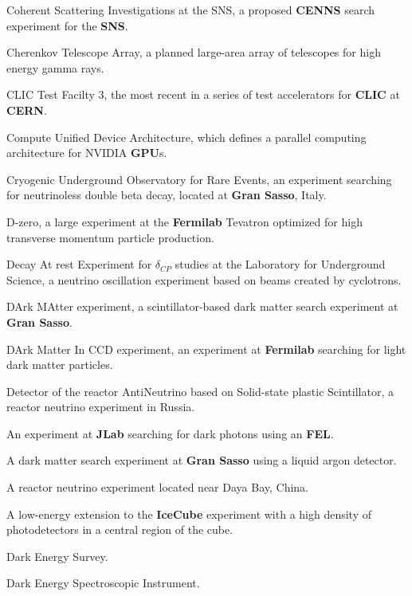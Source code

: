  Coherent Scattering Investigations at the SNS, a
 proposed {\bf CENNS} search experiment for the {\bf SNS}.


 Cherenkov Telescope Array, a planned large-area array of 
telescopes for high energy gamma rays.

  CLIC Test Facilty 3, the most recent in a series of 
      test accelerators for {\bf CLIC} at {\bf CERN}. 

  Compute Unified Device Architecture, which  defines a parallel computing 
  architecture for NVIDIA {\bf GPU}s.


 Cryogenic Underground Observatory for Rare Events, an
experiment searching for neutrinoless double  beta decay, located at
{\bf Gran Sasso}, Italy.

 D-zero, a large experiment at the {\bf Fermilab} Tevatron
optimized for high transverse momentum particle production.  

 Decay At rest Experiment for $\delta_{CP}$ 
studies at the Laboratory for Underground Science, a neutrino oscillation
experiment based on beams created by cyclotrons.

    DArk MAtter experiment, a scintillator-based dark 
 matter search experiment at {\bf Gran Sasso}.


  DArk Matter In CCD experiment, an experiment at 
      {\bf Fermilab} searching for light dark matter  particles.

 Detector of the reactor AntiNeutrino based on
Solid-state plastic Scintillator, a reactor neutrino experiment in
Russia.

  An experiment at {\bf JLab} searching for 
  dark photons using an {\bf FEL}.

  A dark matter search experiment at {\bf Gran
  Sasso}
       using a  liquid argon detector.

 A reactor neutrino experiment located near Daya Bay, China.

 A low-energy extension to the {\bf IceCube} experiment
with a high density of photodetectors in a central region of the cube.


  Dark Energy Survey.

  Dark Energy Spectroscopic Instrument.


